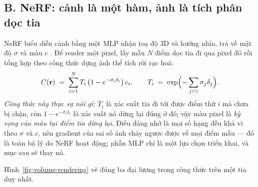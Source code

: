 \documentclass[../../../deep_learning.tex]{subfiles}
\begin{document}
\subsection{B. NeRF: cảnh là một hàm, ảnh là tích phân dọc tia}
NeRF biểu diễn cảnh bằng một MLP nhận toạ độ 3D và hướng nhìn, trả về mật độ \(\sigma\) và màu \(c\) \cite{mildenhall2020nerf}. Để render một pixel, lấy mẫu \(N\) điểm dọc tia đi qua pixel đó rồi tổng hợp theo công thức dựng ảnh thể tích rời rạc hoá:
\[
C(\mathbf{r}) \;=\; \sum_{i=1}^{N} T_i\,\bigl(1-e^{-\sigma_i \delta_i}\bigr)\,c_i,
\qquad
T_i \;=\; \exp\Bigl(-\sum_{j<i}\sigma_j\delta_j\Bigr).
\]
\emph{Công thức này thực sự nói gì:} \(T_i\) là xác suất tia đi tới được điểm thứ \(i\) mà chưa bị chặn, còn \(1-e^{-\sigma_i\delta_i}\) là xác suất nó dừng lại đúng ở đó; vậy màu pixel là \emph{kỳ vọng của màu tại điểm tia dừng lại}. Điều đáng nhớ là mọi số hạng đều khả vi theo \(\sigma\) và \(c\), nên gradient của sai số ảnh chảy ngược được về mọi điểm mẫu --- đó là toàn bộ lý do NeRF hoạt động; phần MLP chỉ là một lựa chọn triển khai, và mục sau sẽ thay nó.

Hình~\ref{fig:volume-rendering} vẽ đúng ba đại lượng trong công thức trên một tia duy nhất.
\end{document}

